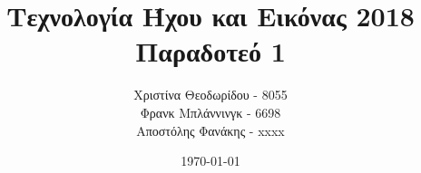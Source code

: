 \documentclass[11pt]{article}
\title{Τεχνολογία Ήχου και Εικόνας 2018\\
    Παραδοτεό 1}
\author{Χριστίνα Θεοδωρίδου - 8055\\
    Φρανκ Μπλάννινγκ - 6698\\
    Αποστόλης Φανάκης - xxxx}
\date{\today}
\begin{document}
  {\titlefont \maketitle}
  
  

    
  
  
    


  \tableofcontents

  \newpage
  
  

  
  
  
  
  
 
\end{document}
